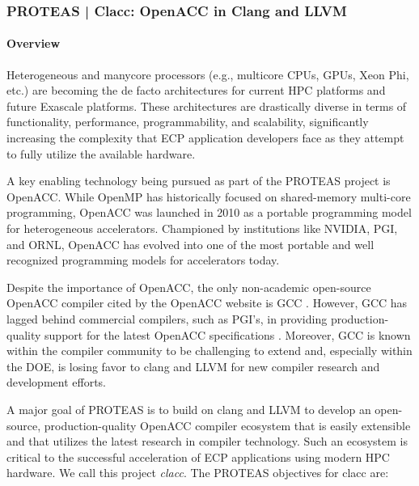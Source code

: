 \subsubsection{PROTEAS | Clacc: OpenACC in Clang and LLVM}\label{s:clacc}

\newcommand{\todo}[1]{\textbf{\textcolor{red}{#1}}}

\paragraph{Overview}

Heterogeneous and manycore processors (e.g., multicore CPUs, GPUs, Xeon Phi,
etc.) are becoming the de facto architectures for current HPC platforms and
future Exascale platforms.  These architectures are drastically diverse in
terms of functionality, performance, programmability, and scalability,
significantly increasing the complexity that ECP application developers face
as they attempt to fully utilize the available hardware.

A key enabling technology being pursued as part of the PROTEAS project is
OpenACC.  While OpenMP has historically focused on shared-memory multi-core
programming, OpenACC was launched in 2010 as a portable programming model
for heterogeneous accelerators.  Championed by institutions like NVIDIA,
PGI, and ORNL, OpenACC has evolved into one of the most portable and well
recognized programming models for accelerators today.

Despite the importance of OpenACC, the only non-academic open-source OpenACC
compiler cited by the OpenACC website is GCC \cite{openaccOrgTools}.
However, GCC has lagged behind commercial compilers, such as PGI's, in
providing production-quality support for the latest OpenACC specifications
\cite{openACCValidationSuite}.  Moreover, GCC is known within the compiler
community to be challenging to extend and, especially within the DOE, is
losing favor to clang and LLVM for new compiler research and development
efforts.

A major goal of PROTEAS is to build on clang and LLVM to develop an
open-source, production-quality OpenACC compiler ecosystem that is easily
extensible and that utilizes the latest research in compiler technology.
Such an ecosystem is critical to the successful acceleration of ECP
applications using modern HPC hardware.  We call this project \emph{clacc}.
The PROTEAS objectives for clacc are:

